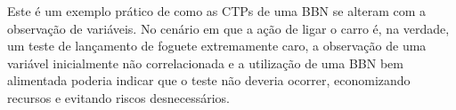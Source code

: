 Este é um exemplo prático de como as CTPs de uma BBN se alteram com a observação de variáveis. No cenário em que a ação de ligar o carro é, na verdade, um teste de lançamento de foguete extremamente caro, a observação de uma variável inicialmente não correlacionada e a utilização de uma BBN bem alimentada poderia indicar que o teste não deveria ocorrer, economizando recursos e evitando riscos desnecessários.
